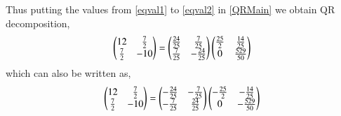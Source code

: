 \documentclass[journal,12pt,twocolumn]{IEEEtran}
\begin{document}
Thus putting the values from \eqref{eqval1} to \eqref{eqval2} in \eqref{QRMain} we obtain QR decomposition,
\begin{align}
    \begin{pmatrix}12 & \frac{7}{2}\\ \frac{7}{2} & -10\end{pmatrix} =\begin{pmatrix}\frac{24}{25}&\frac{7}{25}\\\frac{7}{25}&-\frac{24}{25}\end{pmatrix}\begin{pmatrix}\frac{25}{2}&\frac{14}{25}\\0&\frac{529}{50}\end{pmatrix}
\end{align}
which can also be written as,
\begin{align}
   \begin{pmatrix}12 & \frac{7}{2}\\ \frac{7}{2} & -10\end{pmatrix} =\begin{pmatrix}-\frac{24}{25}&-\frac{7}{25}\\-\frac{7}{25}&\frac{24}{25}\end{pmatrix}\begin{pmatrix}-\frac{25}{2}&-\frac{14}{25}\\0&-\frac{529}{50}\end{pmatrix}
\end{align}
\end{document}
